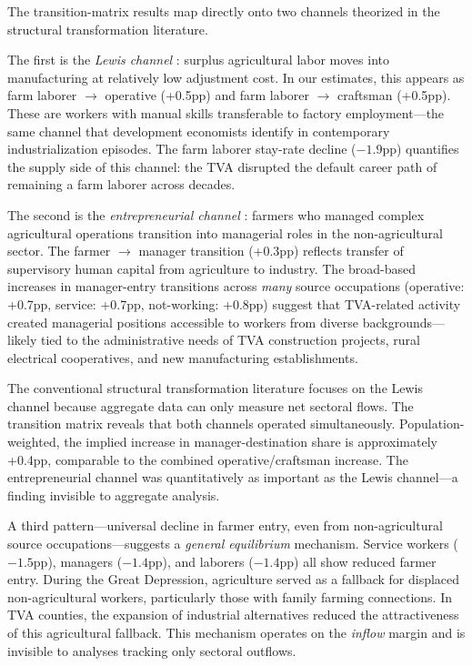 \documentclass[12pt]{article}
\begin{document}
The transition-matrix results map directly onto two channels theorized in the structural transformation literature.

The first is the \textit{Lewis channel} \citep{lewis1954}: surplus agricultural labor moves into manufacturing at relatively low adjustment cost. In our estimates, this appears as farm laborer $\to$ operative (+0.5pp) and farm laborer $\to$ craftsman (+0.5pp). These are workers with manual skills transferable to factory employment---the same channel that development economists identify in contemporary industrialization episodes. The farm laborer stay-rate decline ($-1.9$pp) quantifies the supply side of this channel: the TVA disrupted the default career path of remaining a farm laborer across decades.

The second is the \textit{entrepreneurial channel} \citep[cf.][]{gollin2014}: farmers who managed complex agricultural operations transition into managerial roles in the non-agricultural sector. The farmer $\to$ manager transition (+0.3pp) reflects transfer of supervisory human capital from agriculture to industry. The broad-based increases in manager-entry transitions across \textit{many} source occupations (operative: +0.7pp, service: +0.7pp, not-working: +0.8pp) suggest that TVA-related activity created managerial positions accessible to workers from diverse backgrounds---likely tied to the administrative needs of TVA construction projects, rural electrical cooperatives, and new manufacturing establishments.

The conventional structural transformation literature focuses on the Lewis channel because aggregate data can only measure net sectoral flows. The transition matrix reveals that both channels operated simultaneously. Population-weighted, the implied increase in manager-destination share is approximately +0.4pp, comparable to the combined operative/craftsman increase. The entrepreneurial channel was quantitatively as important as the Lewis channel---a finding invisible to aggregate analysis.

A third pattern---universal decline in farmer entry, even from non-agricultural source occupations---suggests a \textit{general equilibrium} mechanism. Service workers ($-1.5$pp), managers ($-1.4$pp), and laborers ($-1.4$pp) all show reduced farmer entry. During the Great Depression, agriculture served as a fallback for displaced non-agricultural workers, particularly those with family farming connections. In TVA counties, the expansion of industrial alternatives reduced the attractiveness of this agricultural fallback. This mechanism operates on the \textit{inflow} margin and is invisible to analyses tracking only sectoral outflows.
\end{document}
